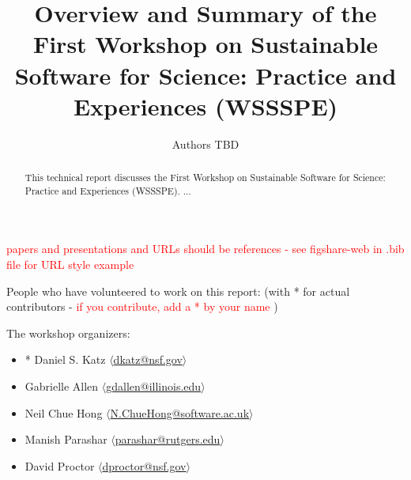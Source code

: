 \documentclass[11pt, oneside]{amsart}
\newcommand{\note}[1]{ {\textcolor{red}    { #1 }}}
\begin{document}
\title[]{Overview and Summary of the First Workshop on Sustainable Software for Science: Practice and Experiences (WSSSPE)}

\author{Authors TBD}

%
%
%
%
%  

    
\begin{abstract}
This technical report discusses the First Workshop on Sustainable Software for Science: Practice and Experiences (WSSSPE). ...
\end{abstract}


\maketitle

\note{papers and presentations and URLs should be references - see figshare-web in .bib file for URL style example}

People who have volunteered to work on this report: (with * for actual contributors - \note{if you contribute, add a * by your name})

The workshop organizers:
\begin{itemize}
\item * Daniel S. Katz $\langle$\url{dkatz@nsf.gov}$\rangle$
\item Gabrielle Allen $\langle$\url{gdallen@illinois.edu}$\rangle$
\item Neil Chue Hong $\langle$\url{N.ChueHong@software.ac.uk}$\rangle$
\item Manish Parashar $\langle$\url{parashar@rutgers.edu}$\rangle$
\item David Proctor $\langle$\url{dproctor@nsf.gov}$\rangle$
\end{itemize}
\end{document}
